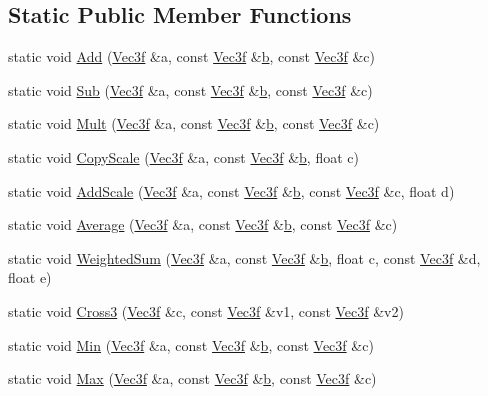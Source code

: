 \subsection*{Static Public Member Functions}
\begin{DoxyCompactItemize}
\item 
static void \hyperlink{classVec3f_aacdb516f519347a97e3afb4b3eaf85cf}{Add} (\hyperlink{classVec3f}{Vec3f} \&a, const \hyperlink{classVec3f}{Vec3f} \&\hyperlink{classVec3f_a022e6dd724965fa27ba4a448f54a66fe}{b}, const \hyperlink{classVec3f}{Vec3f} \&c)
\item 
static void \hyperlink{classVec3f_adcc5b655fe33dd68e31ab8c583edb24e}{Sub} (\hyperlink{classVec3f}{Vec3f} \&a, const \hyperlink{classVec3f}{Vec3f} \&\hyperlink{classVec3f_a022e6dd724965fa27ba4a448f54a66fe}{b}, const \hyperlink{classVec3f}{Vec3f} \&c)
\item 
static void \hyperlink{classVec3f_a47a21f4964e17c407b4eab7b9e9c57ae}{Mult} (\hyperlink{classVec3f}{Vec3f} \&a, const \hyperlink{classVec3f}{Vec3f} \&\hyperlink{classVec3f_a022e6dd724965fa27ba4a448f54a66fe}{b}, const \hyperlink{classVec3f}{Vec3f} \&c)
\item 
static void \hyperlink{classVec3f_a0051eb38dab417945be8b3944f17c905}{Copy\+Scale} (\hyperlink{classVec3f}{Vec3f} \&a, const \hyperlink{classVec3f}{Vec3f} \&\hyperlink{classVec3f_a022e6dd724965fa27ba4a448f54a66fe}{b}, float c)
\item 
static void \hyperlink{classVec3f_aa528c0a3de60ed84203ad55b301b1ac7}{Add\+Scale} (\hyperlink{classVec3f}{Vec3f} \&a, const \hyperlink{classVec3f}{Vec3f} \&\hyperlink{classVec3f_a022e6dd724965fa27ba4a448f54a66fe}{b}, const \hyperlink{classVec3f}{Vec3f} \&c, float d)
\item 
static void \hyperlink{classVec3f_a8cde49b7f82d31c0a8982481d6ad8135}{Average} (\hyperlink{classVec3f}{Vec3f} \&a, const \hyperlink{classVec3f}{Vec3f} \&\hyperlink{classVec3f_a022e6dd724965fa27ba4a448f54a66fe}{b}, const \hyperlink{classVec3f}{Vec3f} \&c)
\item 
static void \hyperlink{classVec3f_a57ef802daeae190571da7e5c480d4ccc}{Weighted\+Sum} (\hyperlink{classVec3f}{Vec3f} \&a, const \hyperlink{classVec3f}{Vec3f} \&\hyperlink{classVec3f_a022e6dd724965fa27ba4a448f54a66fe}{b}, float c, const \hyperlink{classVec3f}{Vec3f} \&d, float e)
\item 
static void \hyperlink{classVec3f_a07d559fa6f6b5809daeba8ae99051360}{Cross3} (\hyperlink{classVec3f}{Vec3f} \&c, const \hyperlink{classVec3f}{Vec3f} \&v1, const \hyperlink{classVec3f}{Vec3f} \&v2)
\item 
static void \hyperlink{classVec3f_aa7d7a2d18d4223baa56aab1af7602960}{Min} (\hyperlink{classVec3f}{Vec3f} \&a, const \hyperlink{classVec3f}{Vec3f} \&\hyperlink{classVec3f_a022e6dd724965fa27ba4a448f54a66fe}{b}, const \hyperlink{classVec3f}{Vec3f} \&c)
\item 
static void \hyperlink{classVec3f_a06c5a88aefac724277f118b24df6bd0a}{Max} (\hyperlink{classVec3f}{Vec3f} \&a, const \hyperlink{classVec3f}{Vec3f} \&\hyperlink{classVec3f_a022e6dd724965fa27ba4a448f54a66fe}{b}, const \hyperlink{classVec3f}{Vec3f} \&c)
\end{DoxyCompactItemize}
